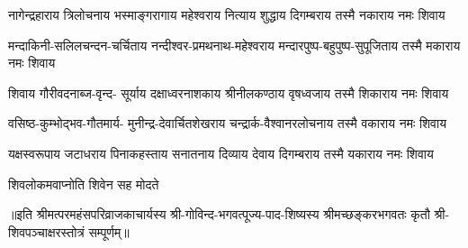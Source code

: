 

\fourlineindentedshloka
{नागेन्द्रहाराय त्रिलोचनाय}
{भस्माङ्गरागाय महेश्वराय}
{नित्याय शुद्धाय दिगम्बराय}
{तस्मै नकाराय नमः शिवाय}%

\fourlineindentedshloka
{मन्दाकिनी-सलिलचन्दन-चर्चिताय}
{नन्दीश्वर-प्रमथनाथ-महेश्वराय}
{मन्दारपुष्प-बहुपुष्प-सुपूजिताय}
{तस्मै मकाराय नमः शिवाय}%

\fourlineindentedshloka
{शिवाय गौरीवदनाब्ज-वृन्द-}
{सूर्याय दक्षाध्वरनाशकाय}
{श्रीनीलकण्ठाय वृषध्वजाय}
{तस्मै शिकाराय नमः शिवाय}%

\fourlineindentedshloka
{वसिष्ठ-कुम्भोद्भव-गौतमार्य-}
{मुनीन्द्र-देवार्चितशेखराय}
{चन्द्रार्क-वैश्वानरलोचनाय}
{तस्मै वकाराय नमः शिवाय}%

\fourlineindentedshloka
{यक्षस्वरूपाय जटाधराय}
{पिनाकहस्ताय सनातनाय}
{दिव्याय देवाय दिगम्बराय}
{तस्मै यकाराय नमः शिवाय}%

{शिवलोकमवाप्नोति शिवेन सह मोदते}

॥इति श्रीमत्परमहंसपरिव्राजकाचार्यस्य श्री-गोविन्द-भगवत्पूज्य-पाद-शिष्यस्य
श्रीमच्छङ्करभगवतः कृतौ श्री-शिवपञ्चाक्षरस्तोत्रं सम्पूर्णम्॥